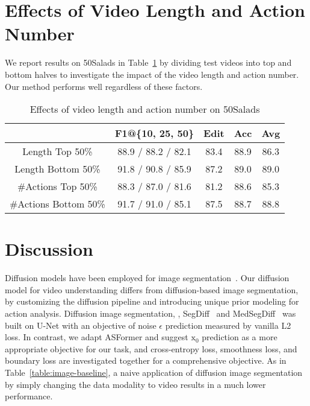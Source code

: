 \documentclass[10pt,twocolumn,letterpaper]{article}
\begin{document}
\section{Effects of Video Length and Action Number} 
We report results on 50Salads in Table~\ref{table:50-50} by dividing test videos into top and bottom halves to investigate the impact of the video length and action number. 
Our method performs well regardless of these factors.
\begin{table}[t]
\begin{center}
\footnotesize
\begin{tabular}{c | c c c c c c }
\hline
  & \multicolumn{3}{c}{F1@\{10, 25, 50\}} & Edit & Acc & Avg \\
\hline
Length Top 50\% & \multicolumn{3}{c}{ 88.9 / 88.2 / 82.1} & 83.4 & 88.9 & 86.3 \\
Length Bottom 50\% & \multicolumn{3}{c}{ 91.8 / 90.8 / 85.9} & 87.2 & 89.0 & 89.0 \\
\hline
\#Actions Top 50\% & \multicolumn{3}{c}{ 88.3 / 87.0 / 81.6} & 81.2 & 88.6 & 85.3 \\
\#Actions Bottom 50\% & \multicolumn{3}{c}{ 91.7 / 91.0 / 85.1} & 87.5 & 88.7 & 88.8 \\
\hline
\end{tabular}
\end{center}
\caption{Effects of video length and action number on 50Salads}
\label{table:50-50}
\end{table}


\section{Discussion} 

Diffusion models have been employed for image segmentation~\cite{2021_ICLR_Baranchuk,SegDiff,MedSegDiff}.
Our diffusion model for video understanding differs from diffusion-based image segmentation, by customizing the diffusion pipeline and introducing unique prior modeling for action analysis. 
Diffusion image segmentation, \eg, SegDiff~\cite{SegDiff} and MedSegDiff~\cite{MedSegDiff} was built on U-Net with an objective of noise $\epsilon$ prediction measured by vanilla L2 loss. 
In contrast, we adapt ASFormer and suggest $\mathrm{x}_0$ prediction as a more appropriate objective for our task, and cross-entropy loss, smoothness loss, and boundary loss are investigated together for a comprehensive objective. 
As in Table~\ref{table:image-baseline}, a naive application of diffusion image segmentation by simply changing the data modality to video results in a much lower performance. 
\end{document}
